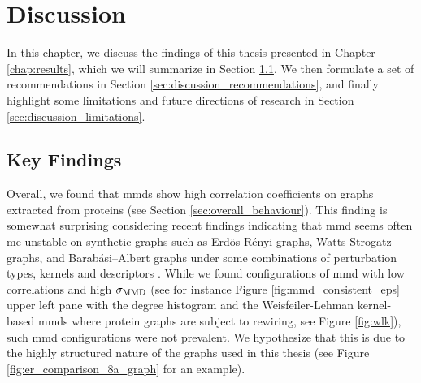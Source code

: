 \chapter{Discussion}\label{chap:discussion}

In this chapter, we discuss the findings of this thesis presented in Chapter
\ref{chap:results}, which we will summarize in Section \ref{sec:key_findings}.
We then formulate a set of recommendations in Section
\ref{sec:discussion_recommendations}, and finally highlight some limitations and
future directions of research in Section \ref{sec:discussion_limitations}.

\section{Key Findings}\label{sec:key_findings}

Overall, we found that \gls{mmd}s show high correlation coefficients on
graphs extracted from proteins (see Section \ref{sec:overall_behaviour}). This
finding is somewhat surprising considering recent findings indicating that
\gls{mmd} seems often me unstable on synthetic graphs such as Erd\"os-Rényi
graphs, Watts-Strogatz graphs, and Barabási–Albert graphs under some
combinations of perturbation types, kernels and descriptors
\citep{obray2022evaluation}. While we found configurations of \gls{mmd} with
low correlations and high $\sigma_{\text{MMD}}$ (see for instance Figure
\ref{fig:mmd_consistent_eps} upper left pane with the degree histogram and the
Weisfeiler-Lehman kernel-based \gls{mmd}s where protein graphs are subject to
rewiring, see Figure \ref{fig:wlk}), such \gls{mmd} configurations were not
prevalent. We hypothesize that this is due to the highly structured nature of
the graphs used in this thesis (see Figure \ref{fig:er_comparison_8a_graph} for
an example).

